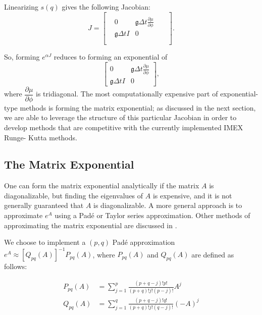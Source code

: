 \documentclass{csri19}
\newcommand{\CFKg}{\mathfrak{g}}
\begin{document}
Linearizing $s(q)$ gives the following Jacobian:
\[ J = \begin{bmatrix}
 &                  &                                                   &  & \\
 & 0                & \CFKg \Delta t \frac{\partial \mu}{\partial \phi} &  & \\
 & \CFKg \Delta t I & 0                                                 &  & \\
 &                  &                                                   &  & \\
 &                  &                                                   &  & \end{bmatrix}.\]

So, forming $e^{\alpha J}$ reduces to forming an exponential of 
\[ \begin{bmatrix}
   0              & \CFKg \Delta t \frac{\partial \mu}{\partial \phi} \\
 \CFKg \Delta t I & 0  \end{bmatrix},\]
where $\dfrac{\partial \mu}{\partial \phi}$ is tridiagonal. The most 
computationally expensive part of exponential-type methods is forming the 
matrix exponential; as discussed in the next section, we are able to 
leverage the structure of this particular Jacobian in order to develop 
methods that are competitive with the currently implemented IMEX Runge-
Kutta methods.

\subsection{The Matrix Exponential}\label{CFK:sec:matexp} 
One can form the matrix exponential analytically if the matrix $A$ is 
diagonalizable, but finding the eigenvalues of $A$ is expensive, and it is
 not generally guaranteed that $A$ is diagonalizable. A more general 
approach is to approximate $e^{A}$ using a Pad\'e or Taylor series 
approximation. Other methods of approximating the matrix exponential are 
discussed in \cite{CFK:Moler2003}.

We choose to implement a $(p,q)$ Pad\'e approximation 
$e^{A}\approx \left[Q_{pq}(A)\right]^{-1}P_{pq}(A)$, where $P_{pq}(A)$ and 
$Q_{pq}(A)$ are defined as follows:

\begin{align*}
P_{pq}(A) &= \sum_{j=1}^p\frac{(p+q-j)!p!}{(p+q)!j!(p-j)!}A^j\\
Q_{pq}(A) &= \sum_{j=1}^q\frac{(p+q-j)!q!}{(p+q)!j!(q-j)!}(-A)^j
\end{align*}
\end{document}
